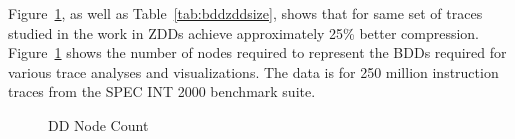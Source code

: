 \documentclass[defaultstyle,11pt]{thesis}
\begin{document}
Figure~\ref{fig:zddbddSize}, as well as Table~\ref{tab:bddzddsize},
shows that for same set of traces studied in the work in
\cite{price:08:pact} ZDDs achieve approximately 25\% better
compression.  Figure~\ref{fig:zddbddSize} shows the number of nodes
required to represent the BDDs required for various trace analyses and
visualizations.  The data is for 250 million instruction traces from
the SPEC INT 2000 benchmark suite.

\begin{figure}  
  \centering
  \caption{DD Node Count}
  \label{fig:zddbddSize}
\end{figure}
\end{document}
